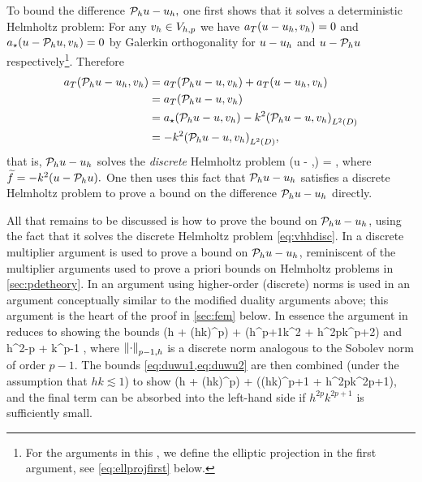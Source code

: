 To bound the difference $\mathcal P_{h} u - u_{h},$ one first shows that it solves a deterministic Helmholtz problem:
For any $v_{h} \in V_{h,p}$ we have $a_{T}(u-u_{h},v_{h}) = 0$ and $a_{\star}(u-\mathcal P_{h} u,v_{h}) = 0$ by Galerkin orthogonality for $u-u_{h}$ and $u-\mathcal P_{h} u$ respectively\footnote{For the arguments in this , we define the elliptic projection in the first argument, see \cref{eq:ellprojfirst} below.}. Therefore
\begin{align*}
  \aT(\Ph u - \uh,\vh) &= \aT(\Ph u - u,\vh) + \aT(u-\uh,\vh)\\
  &= \aT(\Ph u - u,\vh)\\
  &= \aep(\Ph u - u,\vh) - k^2\IPLtD{\Ph u - u}{\vh}\\
  &= - k^2\IPLtD{\Ph u - u}{\vh},
\end{align*}
that is, $\mathcal P_{h} u - u_{h}$ solves the \emph{discrete} Helmholtz problem
\beq\label{eq:vhhdisc}
\aT(\Ph u - \uh,\vh) = \IPLtD{\ftilde}{\vh} \tforall \vh \in \Vhp,
\eeq
where $\ftilde = -k^2\mleft(u-\Ph u\mright).$ One then uses this fact that $\mathcal P_{h} u - u_{h}$ satisfies a discrete Helmholtz problem to prove a bound on the difference $\mathcal P_{h} u - u_{h}$ directly.



All that remains to be discussed is how to prove the bound on $\mathcal P_{h} u - u_{h}$, using the fact that it solves the discrete Helmholtz problem \cref{eq:vhhdisc}. In \cite{FeWu:09,FeWu:11,Wu:14} a discrete multiplier argument is used to prove a bound on $\mathcal P_{h} u - u_{h}$, reminiscent of the multiplier arguments used to prove a priori bounds on Helmholtz problems in \cref{sec:pdetheory}. In \cite{DuWu:15} an argument using higher-order (discrete) norms is used in an argument conceptually similar to the modified duality arguments above; this argument is the heart of the proof in \cref{sec:fem} below. In essence the argument in \cite{DuWu:15} reduces to showing the bounds
\beq\label{eq:duwu1}
 \lesssim \mleft(h + \mleft(hk\mright)^p\mright) + \mleft(h^{p+1}k^2 + h^{2p}k^{p+2}\mright)
\eeq
and
\beq\label{eq:duwu2}
 \lesssim h^{2-p}  + k^{p-1} ,
\eeq
where $\Nfn{p-1,h}{\cdot}$ is a discrete norm analogous to the Sobolev norm of order $p-1$. The bounds \cref{eq:duwu1,eq:duwu2} are then combined (under the assumption that $hk\lesssim 1$) to show
\beqs
{} \lesssim \mleft(h + \mleft(hk\mright)^p\mright) + \mleft(\mleft(hk\mright)^{p+1} + h^{2p}k^{2p+1}\mright),
\eeqs
and the final term can be absorbed into the left-hand side if $h^{2p}k^{2p+1}$ is sufficiently small.

